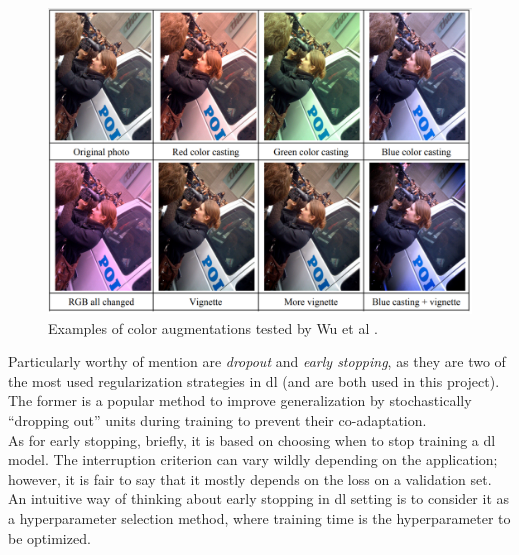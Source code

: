 \begin{figure}[H]
	\begin{center}
		\includegraphics[scale=.55]{img/data_aug.png}
		\captionsetup{margin=2cm}
		\caption{Examples of color augmentations tested by Wu et al \cite{wu2015deep}.}
		\label{fig:data_aug}
	\end{center}
\end{figure}
\noindent Particularly worthy of mention are \textit{dropout}  \cite{srivastava2014dropout} and \textit{early stopping}, as they are two of the most used regularization strategies in \gls{dl} (and are both used in this project). \\
The former is a popular method to improve generalization by stochastically “dropping out” units during training to prevent their co-adaptation.\\
As for early stopping, briefly, it is based on choosing when to stop training a \gls{dl} model. The interruption criterion can vary wildly depending on the application; however, it is fair to say that it mostly depends on the loss on a validation set. An intuitive way of thinking about early stopping in \gls{dl} setting is to consider it as a hyperparameter selection method, where training time is the hyperparameter to be optimized.

